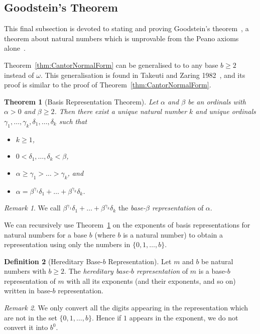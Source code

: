 \documentclass[a4paper,11pt]{article}
\theoremstyle{plain}
\newtheorem{thm}{Theorem}[subsection]
\theoremstyle{definition}
\newtheorem{defn}[thm]{Definition}
\theoremstyle{remark}
\newtheorem*{rem}{Remark}
\begin{document}
\subsection{Goodstein's Theorem}
This final subsection is devoted to stating and proving Goodstein's theorem~\citep{GoodsteinPaper}, a theorem about natural numbers which is unprovable from the Peano axioms alone~\citep{GoodsteinIndependence}.

Theorem~\ref{thm:CantorNormalForm} can be generalised to to any base $b \geq 2$ instead of $\omega$. This generalisation is found in Takeuti and Zaring 1982~\citep[pp. 70--71]{TakeutiZaring}, and its proof is similar to the proof of Theorem~\ref{thm:CantorNormalForm}.

\begin{thm}[Basis Representation Theorem]
\label{thm:BasisPower}
Let $\alpha$ and $\beta$ be an ordinals with $\alpha > 0$ and $\beta \geq 2$. Then there exist a unique natural number $k$ and unique ordinals $\gamma_1,\dots, \gamma_k, \delta_1,\dots,\delta_k$ such that 
\begin{itemize}
\item $k \geq 1$,
\item $0 < \delta_1, \dots, \delta_k < \beta$,
\item $\alpha \geq \gamma_1 > \dots > \gamma_k$, and
\item $\alpha = \beta^{\gamma_1}\delta_1 + \dots + \beta^{\gamma_k}\delta_k$.
\end{itemize}
\end{thm}
\begin{rem}
We call $\beta^{\gamma_1}\delta_1 + \dots + \beta^{\gamma_k}\delta_k$ the \textit{base-$\beta$ representation} of $\alpha$.
\end{rem}

We can recursively use Theorem~\ref{thm:BasisPower} on the exponents of basis representations for natural numbers for a base $b$ (where $b$ is a natural number) to obtain a representation using only the numbers in $\{0,1,\dots,b\}$.

\begin{defn}[Hereditary Base-$b$ Representation]
Let $m$ and $b$ be natural numbers with $b \geq 2$. The \textit{hereditary base-$b$ representation} of $m$ is a base-$b$ representation of $m$ with all its exponents (and their exponents, and so on) written in base-$b$ representation.
\end{defn}
\begin{rem}
We only convert all the digits appearing in the representation which are not in the set $\{0, 1, \dots, b\}$. Hence if $1$ appears in the exponent, we do not convert it into $b^0$.
\end{rem}
\end{document}
